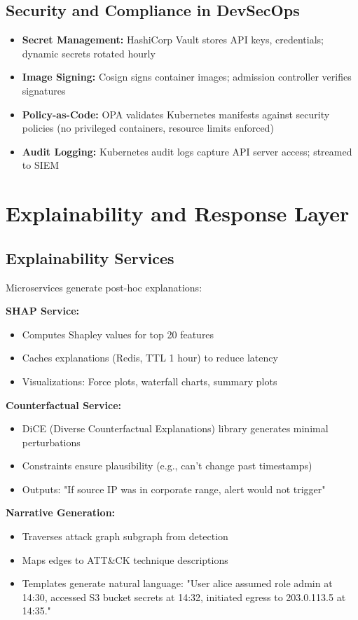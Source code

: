 \subsection{Security and Compliance in DevSecOps}
\begin{itemize}
    \item \textbf{Secret Management:} HashiCorp Vault stores API keys, credentials; dynamic secrets rotated hourly
    \item \textbf{Image Signing:} Cosign signs container images; admission controller verifies signatures
    \item \textbf{Policy-as-Code:} OPA validates Kubernetes manifests against security policies (no privileged containers, resource limits enforced)
    \item \textbf{Audit Logging:} Kubernetes audit logs capture API server access; streamed to SIEM
\end{itemize}

\section{Explainability and Response Layer}\label{sec:arch-xai}
\subsection{Explainability Services}
Microservices generate post-hoc explanations:

\textbf{SHAP Service:}
\begin{itemize}
    \item Computes Shapley values for top 20 features
    \item Caches explanations (Redis, TTL 1 hour) to reduce latency
    \item Visualizations: Force plots, waterfall charts, summary plots
\end{itemize}

\textbf{Counterfactual Service:}
\begin{itemize}
    \item DiCE (Diverse Counterfactual Explanations) library generates minimal perturbations
    \item Constraints ensure plausibility (e.g., can't change past timestamps)
    \item Outputs: "If source IP was in corporate range, alert would not trigger"
\end{itemize}

\textbf{Narrative Generation:}
\begin{itemize}
    \item Traverses attack graph subgraph from detection
    \item Maps edges to ATT\&CK technique descriptions
    \item Templates generate natural language: "User alice assumed role admin at 14:30, accessed S3 bucket secrets at 14:32, initiated egress to 203.0.113.5 at 14:35."
\end{itemize}

